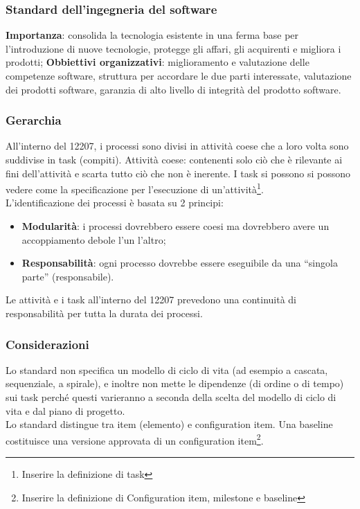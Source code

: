 \subsubsection{Standard dell'ingegneria del software}
\textbf{Importanza}: consolida la tecnologia esistente in una ferma base per l'introduzione di nuove tecnologie, protegge gli affari, gli acquirenti e migliora i prodotti;
\textbf{Obbiettivi organizzativi}: miglioramento e valutazione delle competenze software, struttura per accordare le due parti interessate, valutazione dei prodotti software, garanzia di alto livello di integrità del prodotto software.

\subsubsection{Gerarchia}
All'interno del 12207, i processi sono divisi in attività coese che a loro volta sono suddivise in task (compiti).
Attività coese: contenenti solo ciò che è rilevante ai fini dell'attività e scarta tutto ciò che non è inerente.
I task si possono si possono vedere come la specificazione per l'esecuzione di un'attività\footnote{Inserire la definizione di task}.\\
L'identificazione dei processi è basata su 2 principi:
\begin{itemize}
\item \textbf{Modularità}: i processi dovrebbero essere coesi ma dovrebbero avere un accoppiamento debole l'un l'altro;
\item \textbf{Responsabilità}: ogni processo dovrebbe essere eseguibile da una ``singola parte'' (responsabile).
\end{itemize}
Le attività e i task all'interno del 12207 prevedono una continuità di responsabilità per tutta la durata dei processi.

\subsubsection{Considerazioni}
Lo standard non specifica un modello di ciclo di vita (ad esempio a cascata, sequenziale, a spirale), e inoltre non mette le dipendenze (di ordine o di tempo) sui task perché questi varieranno a seconda della scelta del modello di ciclo di vita e dal piano di progetto.\\
Lo standard distingue tra item (elemento) e configuration item. Una baseline costituisce una versione approvata di un configuration item\footnote{Inserire la definizione di Configuration item, milestone e baseline}.

